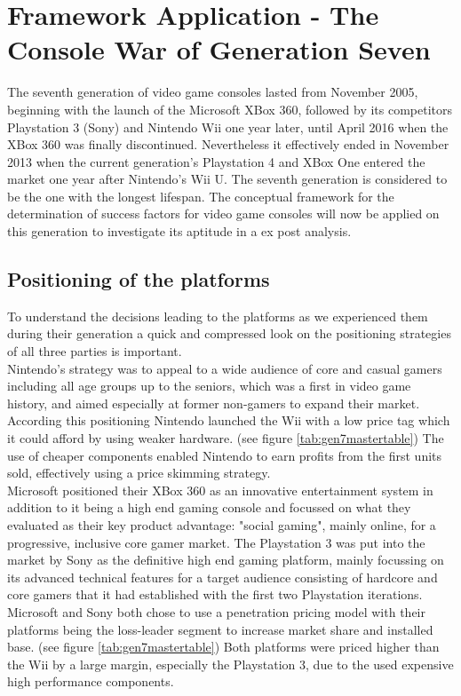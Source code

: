 \documentclass
[
    a4paper,
    11pt
]
{article}
\begin{document}
\section{Framework Application - The Console War of Generation Seven}
\label{application-of-the-framework}
%
The seventh generation of video game consoles lasted from November 2005, beginning with the launch
of the Microsoft XBox 360, followed by its competitors Playstation 3 (Sony) and
Nintendo Wii one year later, until April 2016 when the XBox 360 was finally
discontinued. Nevertheless it effectively ended in November 2013 when the
current generation's Playstation 4 and XBox One entered the market one year after
Nintendo's Wii U. The seventh generation is considered to be the one with the longest
lifespan. The conceptual framework for the determination of success factors for
video game consoles will now be applied on this generation to investigate its
aptitude in a ex post analysis.

\subsection{Positioning of the platforms}
\label{positioning-of-the-platform}
To understand the decisions leading to the platforms as we experienced them
during their generation a quick and compressed look on the positioning strategies
of all three parties is important. \\
Nintendo's strategy was to appeal to a wide audience of core and casual gamers
including all age groups up to the seniors, which was a first in video game
history, and aimed especially at former non-gamers to expand their market. \cite{Casey2006}
According this positioning Nintendo launched the Wii with a low price tag which
it could afford by using weaker hardware. (see figure \ref{tab:gen7mastertable})
The use of cheaper components enabled Nintendo to earn profits from the first
units sold, effectively using a price skimming strategy. \\
Microsoft positioned their XBox 360 as an innovative entertainment system in
addition to it being a high end gaming console and focussed on what they
evaluated as their key product advantage: "social gaming", mainly online, for a progressive,
inclusive core gamer market. \cite{Hall2007} The Playstation 3 was put into the
market by Sony as the definitive high end gaming platform, mainly focussing on
its advanced technical features for a target audience consisting of hardcore and
core gamers that it had established with the first two Playstation iterations.
\cite{Gamesindustry.biz2006} \\
Microsoft and Sony both chose to use a penetration pricing model with their
platforms being the loss-leader segment to increase market share and installed
base. (see figure \ref{tab:gen7mastertable}) Both platforms were priced higher
than the Wii by a large margin, especially the Playstation 3, due to the used
expensive high performance components.
\end{document}
